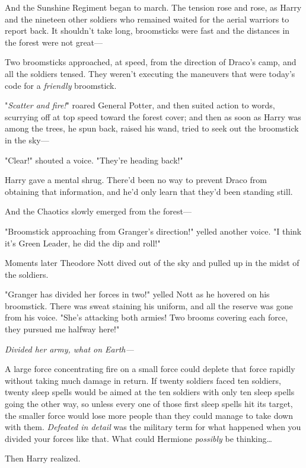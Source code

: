 And the Sunshine Regiment began to march.
\sbreak
The tension rose and rose, as Harry and the nineteen other soldiers who 
remained waited for the aerial warriors to report back. It shouldn't take long, 
broomsticks were fast and the distances in the forest were not great---

Two broomsticks approached, at speed, from the direction of Draco's camp, and 
all the soldiers tensed. They weren't executing the maneuvers that were today's 
code for a \emph{friendly} broomstick.

"\emph{Scatter and fire!}" roared General Potter, and then suited action to 
words, scurrying off at top speed toward the forest cover; and then as soon as 
Harry was among the trees, he spun back, raised his wand, tried to seek out the 
broomstick in the sky---

"Clear!" shouted a voice. "They're heading back!"

Harry gave a mental shrug. There'd been no way to prevent Draco from obtaining 
that information, and he'd only learn that they'd been standing still.

And the Chaotics slowly emerged from the forest---

"Broomstick approaching from Granger's direction!" yelled another voice. "I 
think it's Green Leader, he did the dip and roll!"

Moments later Theodore Nott dived out of the sky and pulled up in the midst of 
the soldiers.

"Granger has divided her forces in two!" yelled Nott as he hovered on his 
broomstick. There was sweat staining his uniform, and all the reserve was gone 
from his voice. "She's attacking both armies! Two brooms covering each force, 
they pursued me halfway here!"

\emph{Divided her army, what on Earth---}

A large force concentrating fire on a small force could deplete that force 
rapidly without taking much damage in return. If twenty soldiers faced ten 
soldiers, twenty sleep spells would be aimed at the ten soldiers with only ten 
sleep spells going the other way, so unless every one of those first sleep 
spells hit its target, the smaller force would lose more people than they could 
manage to take down with them. \emph{Defeated in detail} was the military term 
for what happened when you divided your forces like that. What could Hermione 
\emph{possibly} be thinking{\ldots}

Then Harry realized.

